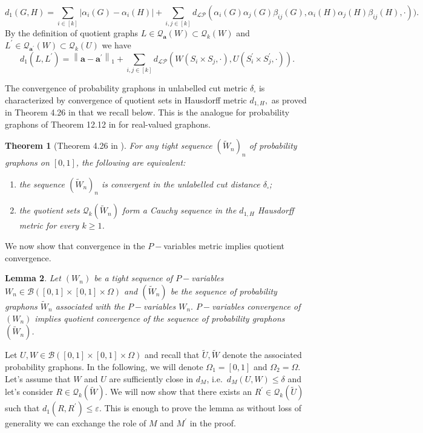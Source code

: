 \documentclass[11pt]{article}
\newtheorem{theorem}{Theorem}[section]
\newtheorem{lemma}[theorem]{Lemma}
\newcommand{\cB}{{\mathcal B}}  %
\begin{document}
$$
d_1\left(G, H\right)=\sum_{i\in[k]}|\alpha_i(G)-\alpha_i(H)|+\sum_{i, j \in[k]}d_{\mathcal{LP}}(\alpha_i(G)\alpha_j(G)\beta_{ij}(G),\alpha_i(H)\alpha_j(H)\beta_{ij}(H),\cdot)).
$$
By the definition of quotient graphs $L\in \mathcal{Q}_{\mathbf{a}}(W)\subset \mathcal{Q}_{k}(W) $ and $L^{\prime}\in \mathcal{Q}_{\mathbf{a}^{\prime}}(W) \subset\mathcal{Q}_k(U)$ we have
$$
d_1\left(L, L^{\prime}\right)=\left\|\mathbf{a}-\mathbf{a}^{\prime}\right\|_1+\sum_{i, j \in[k]}d_{\mathcal{LP}}(W(S_i \times S_j,\cdot),U(S_i^{\prime} \times S_j^{\prime},\cdot)).
$$

The convergence of probability graphons in unlabelled cut metric $\delta_{\square}$ is characterized by convergence of quotient sets in Hausdorff metric $d_{1,H},$ as proved in Theorem 4.26 in \cite{zucal2024probabilitygraphonsrightconvergence} that we recall below. This is the analogue for probability graphons of Theorem 12.12 in \cite{LovaszGraphLimits} for real-valued graphons. 


\begin{theorem}[Theorem 4.26 in \cite{zucal2024probabilitygraphonsrightconvergence}]\label{ThmEquivQuotients} For any tight sequence $(\widetilde W_n)_n$ of probability graphons on $[0,1]$, the following are equivalent:
\begin{enumerate}
\item the sequence $(\widetilde W_n)_n$ is convergent in the unlabelled cut distance $\delta_{\square}$;

\item the quotient sets $\mathcal{Q}_k(\widetilde W_n)$ form a Cauchy sequence in the $d_{1,H}$ Hausdorff metric for every $k \geq 1$.
\end{enumerate}
\end{theorem}

We now show that convergence in the $P-$variables metric implies quotient convergence.

\begin{lemma}\label{LemmMetricImpliesQuotients}
Let $(W_n)$ be a tight sequence of $P-$variables $W_n\in \cB([0,1]\times [0,1]\times \Omega) $ and $(\widetilde W_n)$ be the sequence of probability graphons $\widetilde W_n$ associated with the $P-$variables $W_n.$   $P-$variables convergence of $(W_n)$ implies quotient convergence of the sequence of probability graphons $(\widetilde W_n)$. 
\end{lemma}
\proof
Let $U,W\in  \cB([0,1]\times [0,1]\times \Omega)$ and recall that $\widetilde U,\widetilde W$ denote the associated probability graphons. In the following, we will denote $\Omega_1=[0,1]$ and $\Omega_2=\Omega.$ Let's assume that $W$ and $U$ are sufficiently close in $d_M$, i.e.\ $d_M(U,W)\leq\delta$ and let's consider $R\in \mathcal{Q}_k(\widetilde W)$. We will now show that there exists an $R^\prime\in \mathcal{Q}_k(\widetilde U)$ such that $d_{1}(R,R^{\prime})\leq\varepsilon$. This is enough to prove the lemma as without loss of generality we can exchange the role of $M$ and $M^{\prime}$ in the proof.  
\end{document}
